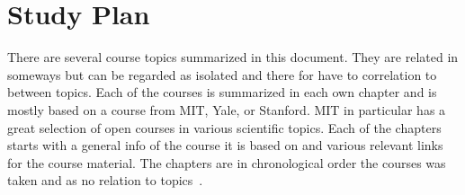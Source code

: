 \documentclass{book}
\author{Anton Augustsson}
\begin{document}
\maketitle
\newpage
\tableofcontents
\newpage



\chapter{Study Plan}
There are several course topics summarized in this document.
They are related in someways but can be regarded as isolated and there for have to correlation to between topics.
Each of the courses is summarized in each own chapter and is mostly based on a course from MIT, Yale, or Stanford.
MIT in particular has a great selection of open courses in various scientific topics. Each of the chapters starts
with a general info of the course it is based on and various relevant links for the course material.
The chapters are in chronological order the courses was taken and as no relation to topics~\cite{2014/35/EU}.
\newpage


\newcommand{\pathMATH}{chapters}

\newcommand{\pathFM}{\pathMATH/Fundamental-Mathematics}  \newpage
\newcommand{\pathAA}{\pathMATH/Abstract-Algebra}  \newpage
\newcommand{\pathT}{\pathMATH/Topology}  \newpage

 

\newpage
\printbibliography
\end{document}

